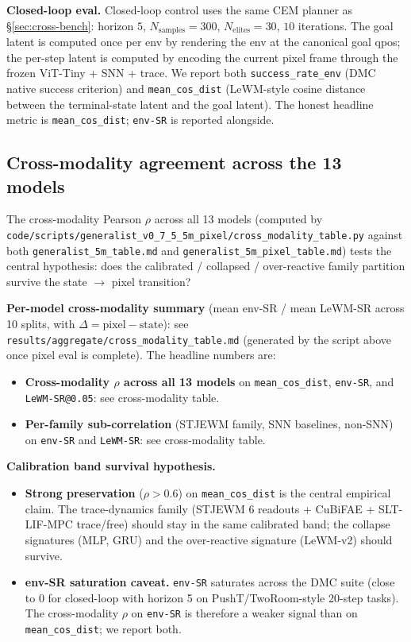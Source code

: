 \documentclass{article}
\begin{document}
\textbf{Closed-loop eval.} Closed-loop control uses the same CEM planner as
\S\ref{sec:cross-bench}: horizon $5$, $N_{\text{samples}}=300$, $N_{\text{elites}}=30$,
$10$ iterations. The goal latent is computed once per env by rendering the env
at the canonical goal qpos; the per-step latent is computed by encoding the
current pixel frame through the frozen ViT-Tiny + SNN + trace. We report
both \texttt{success\_rate\_env} (DMC native success criterion) and
\texttt{mean\_cos\_dist} (LeWM-style cosine distance between the terminal-state
latent and the goal latent). The honest headline metric is
\texttt{mean\_cos\_dist}; \texttt{env-SR} is reported alongside.

\subsection{Cross-modality agreement across the 13 models}

The cross-modality Pearson $\rho$ across all 13 models (computed by
\texttt{code/scripts/generalist\_v0\_7\_5\_5m\_pixel/cross\_modality\_table.py}
against both \texttt{generalist\_5m\_table.md} and
\texttt{generalist\_5m\_pixel\_table.md}) tests the central hypothesis: does
the calibrated / collapsed / over-reactive family partition survive the state
$\to$ pixel transition?

\textbf{Per-model cross-modality summary} (mean env-SR / mean LeWM-SR across
10 splits, with $\Delta = \text{pixel} - \text{state}$): see
\texttt{results/aggregate/cross\_modality\_table.md} (generated by the script
above once pixel eval is complete). The headline numbers are:
\begin{itemize}
\item \textbf{Cross-modality $\rho$ across all 13 models} on
\texttt{mean\_cos\_dist}, \texttt{env-SR}, and \texttt{LeWM-SR@0.05}: see
cross-modality table.
\item \textbf{Per-family sub-correlation} (STJEWM family, SNN baselines,
non-SNN) on \texttt{env-SR} and \texttt{LeWM-SR}: see cross-modality table.
\end{itemize}

\textbf{Calibration band survival hypothesis.}
\begin{itemize}
\item \textbf{Strong preservation} ($\rho > 0.6$) on \texttt{mean\_cos\_dist}
is the central empirical claim. The trace-dynamics family (STJEWM 6 readouts
+ CuBiFAE + SLT-LIF-MPC trace/free) should stay in the same calibrated band;
the collapse signatures (MLP, GRU) and the over-reactive signature (LeWM-v2)
should survive.
\item \textbf{env-SR saturation caveat.} \texttt{env-SR} saturates across
the DMC suite (close to 0 for closed-loop with horizon 5 on PushT/TwoRoom-style
20-step tasks). The cross-modality $\rho$ on \texttt{env-SR} is therefore a
weaker signal than on \texttt{mean\_cos\_dist}; we report both.
\end{itemize}
\end{document}

